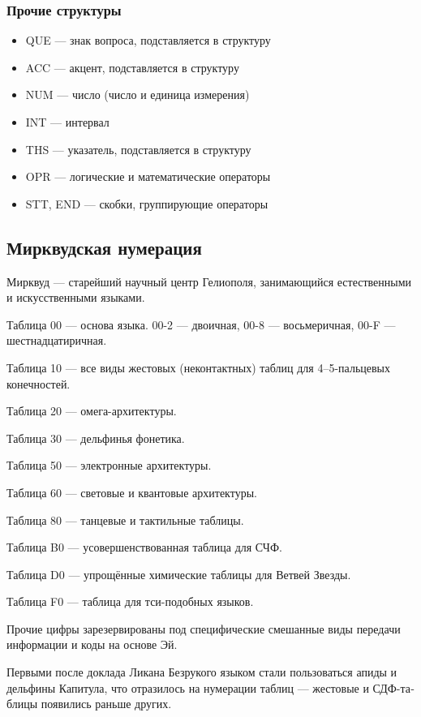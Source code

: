 \documentclass[a4paper,12pt,fleqn]{book}\usepackage{cooltooltips}\usepackage{polyglossia}\setdefaultlanguage[babelshorthands=true]{russian}\setotherlanguage{english}\defaultfontfeatures{Ligatures=TeX,Mapping=tex-text} \usepackage{xcolor}\definecolor{lightgray}{HTML}{bbbbbb}\color{lightgray}\newcommand{\ml}[3]{\textenglish{\textcolor{black}{#3}}}
\begin{document}
{\subsubsection{Прочие структуры}

\begin{itemize}
\item QUE --- знак вопроса, подставляется в структуру
\item ACC --- акцент, подставляется в структуру
\item NUM --- число (число и единица измерения)
\item INT --- интервал
\item THS --- указатель, подставляется в структуру
\item OPR --- логические и математические операторы
\item STT, END --- скобки, группирующие операторы
\end{itemize}

\subsection{Мирквудская нумерация}

Мирквуд --- старейший научный центр Гелиополя, занимающийся естественными и искусственными языками.

Таблица 00 --- основа языка. 00-2 --- двоичная, 00-8 --- восьмеричная, 00-F --- шестнадцатиричная.

Таблица 10 --- все виды жестовых (неконтактных) таблиц для 4--5-пальцевых конечностей.

Таблица 20 --- омега-архитектуры.

Таблица 30 --- дельфинья фонетика.

Таблица 50 --- электронные архитектуры.

Таблица 60 --- световые и квантовые архитектуры.

Таблица 80 --- танцевые и тактильные таблицы.

Таблица B0 --- усовершенствованная таблица для СЧФ.

Таблица D0 --- упрощённые химические таблицы для Ветвей Звезды.

Таблица F0 --- таблица для тси-подобных языков.

Прочие цифры зарезервированы под специфические смешанные виды передачи информации и коды на основе Эй.

Первыми после доклада Ликана Безрукого языком стали пользоваться апиды и дельфины Капитула, что отразилось на нумерации таблиц --- жестовые и СДФ-таблицы появились раньше других.

}
\end{document}
